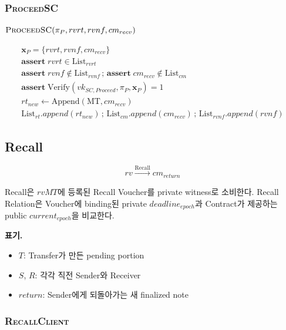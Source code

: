 \documentclass[11pt,a4paper]{extarticle}
\newcommand{\Verify}{\mathrm{Verify}}
\newcommand{\Append}{\mathrm{Append}}
\newcommand{\Assert}{\mathbf{assert}\;}
\newcommand{\List}[1]{\mathrm{List}_{#1}}
\newcommand{\MT}{\mathrm{MT}}
\newenvironment{schemeblock}
{%
  \begingroup
  \setlength{\jot}{8pt}%
  \setlength{\parskip}{0pt}%
  \setlength{\abovedisplayskip}{9pt}%
  \setlength{\belowdisplayskip}{0pt}%
  \setlength{\abovedisplayshortskip}{9pt}%
  \setlength{\belowdisplayshortskip}{0pt}%
  \begin{mdframed}[
    linewidth=0.4pt,
    linecolor=black,
    innerleftmargin=8pt,
    innerrightmargin=8pt,
    innertopmargin=8pt,
    innerbottommargin=8pt,
    skipabove=0pt,
    skipbelow=5pt,
    splittopskip=8pt,
    splitbottomskip=8pt
  ]
  \centering
}
{%
  \end{mdframed}
  \endgroup
}
\begin{document}
\subsubsection{\textsc{ProceedSC}}

\begin{schemeblock}
\(
  \textsc{ProceedSC}(\pi_P,rvrt,rvnf,cm_{recv})
\)

\begin{gather*}
  \mathbf{x}_P=\{rvrt,rvnf,cm_{recv}\}
  \\
  \Assert rvrt\in\List{rvrt}
  \\
  \Assert rvnf\notin\List{rvnf}
  \,;\,
  \Assert cm_{recv}\notin\List{cm}
  \\
  \Assert
  \Verify(vk_{SC,Proceed},\pi_P,\mathbf{x}_P)=1
  \\
  rt_{new}\gets\Append(\MT,cm_{recv})
  \\
  \List{rt}.append(rt_{new})
  \,;\,
  \List{cm}.append(cm_{recv})
  \,;\,
  \List{rvnf}.append(rvnf)
\end{gather*}
\end{schemeblock}

\subsection{Recall}

\[
  rv\xrightarrow{\mathrm{Recall}}cm_{return}
\]

Recall은 $rvMT$에 등록된 Recall Voucher를 private witness로 소비한다. Recall
Relation은 Voucher에 binding된 private $deadline_{epoch}$과 Contract가 제공하는
public $current_{epoch}$을 비교한다.

\noindent\textbf{표기.}
\begin{itemize}[nosep]
  \item $T$: Transfer가 만든 pending portion
  \item $S$, $R$: 각각 직전 Sender와 Receiver
  \item $return$: Sender에게 되돌아가는 새 finalized note
\end{itemize}

\subsubsection{\textsc{RecallClient}}
\end{document}
